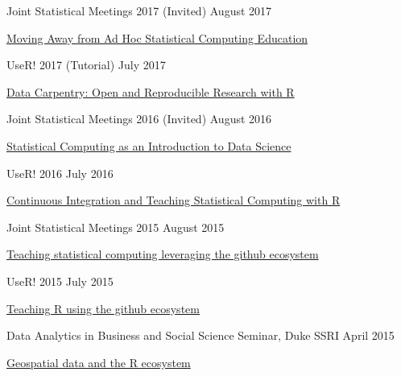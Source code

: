 \documentclass[margin,line]{res}
\begin{document}
\begin{resume}
Joint Statistical Meetings 2017 (Invited) \hfill August 2017
\begin{list1}
\item[] \href{https://github.com/rundel/Presentations/tree/master/JSM%202017}{Moving Away from Ad Hoc Statistical Computing Education}
\end{list1}
\vspace{-2mm}

UseR! 2017 (Tutorial) \hfill July 2017
\begin{list1}
\item[] \href{https://github.com/fmichonneau/2017-useR-reproducibility/}{Data Carpentry: Open and Reproducible Research with R}
\end{list1}
\vspace{-2mm}

Joint Statistical Meetings 2016 (Invited) \hfill August 2016
\begin{list1}
\item[] \href{https://github.com/rundel/Presentations/tree/master/JSM%202016}{Statistical Computing as an Introduction to Data Science}
\end{list1}
\vspace{-2mm}

UseR! 2016 \hfill July 2016
\begin{list1}
\item[] \href{https://github.com/rundel/Presentations/tree/master/UseR2016}{Continuous Integration and Teaching Statistical Computing with R}
\end{list1}
\vspace{-2mm}


Joint Statistical Meetings 2015 \hfill August 2015
\begin{list1}
\item[] \href{https://github.com/rundel/Presentations/tree/master/JSM%202015}{Teaching statistical computing leveraging the github ecosystem}
\end{list1}
\vspace{-2mm}

UseR! 2015 \hfill July 2015
\begin{list1}
\item[] \href{https://github.com/rundel/Presentations/tree/master/UseR2015}{Teaching R using the github ecosystem}
\end{list1}
\vspace{-2mm}


Data Analytics in Business and Social Science Seminar, Duke SSRI \hfill April 2015
\begin{list1}
\item[] \href{https://github.com/rundel/Presentations/tree/master/Duke%202015%20-%20DABSS}{Geospatial data and the R ecosystem}
\end{list1}
\vspace{-2mm}


\end{resume}
\end{document}
